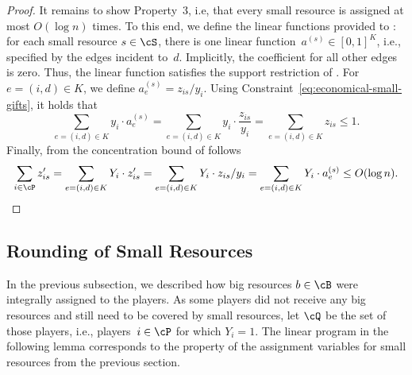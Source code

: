 \begin{proof}
It remains to show Property~3, i.e, that every small resource
is assigned at most $O(\log n)$ times.
To this end, we define the linear functions provided to : 
for each small resource $s\in \cS$,
there is one linear function~$a^{(s)}\in [0,1]^K$,
i.e., specified by the edges incident to~$d$.
Implicitly, the coefficient for all other edges is zero.
Thus,
the linear function satisfies the support restriction of 
.
For $e = (i, d) \in K$, we define
$a^{(s)}_e = z_{is} / y_i$.
Using Constraint~\eqref{eq:economical-small-gifts}, it holds that
\begin{equation*}
\sum_{e = (i, d) \in K} y_i \cdot a^{(s)}_e = 
\sum_{e = (i, d) \in K} y_i \cdot \frac{z_{is}}{y_i} = 
\sum_{e = (i, d) \in K} z_{is} \le 1 . 
\end{equation*}
Finally, from the concentration bound of  follows
\begin{equation*}
\sum_{i\in \cP} z'_{is}
= \sum_{e = (i, d) \in K} Y_i \cdot z'_{is}
= \sum_{e = (i, d) \in K} Y_i \cdot z_{is} / y_i
= \sum_{e = (i, d) \in K} Y_i \cdot a^{(s)}_e \le O(\log n) . \qedhere
\end{equation*}
\end{proof}

\subsection{Rounding of Small Resources}
\label{sec:rounding-of-small-items}
In the previous subsection, we described how big resources $b \in \cB$ were integrally assigned to the players.
As some players did not receive any big resources and still need to be covered by small resources, let
$\cQ$ be the set of those players, i.e., players~$i\in\cP$ 
for which $Y_i = 1$. The linear program in the following lemma
corresponds to the property of the assignment variables
for small resources from the previous section.

